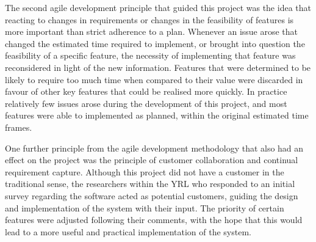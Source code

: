 The second agile development principle that guided this project was the idea that reacting to changes in requirements or changes in the feasibility of features is more important than strict adherence to a plan. Whenever an issue arose that changed the estimated time required to implement, or brought into question the feasibility of a specific feature, the necessity of implementing that feature was reconsidered in light of the new information. Features that were determined to be likely to require too much time when compared to their value were discarded in favour of other key features that could be realised more quickly. In practice relatively few issues arose during the development of this project, and most features were able to implemented as planned, within the original estimated time frames.

One further principle from the agile development methodology that also had an effect on the project was the principle of customer collaboration and continual requirement capture. Although this project did not have a customer in the traditional sense, the researchers within the YRL who responded to an initial survey regarding the software acted as potential customers, guiding the design and implementation of the system with their input. The priority of certain features were adjusted following their comments, with the hope that this would lead to a more useful and practical implementation of the system.

